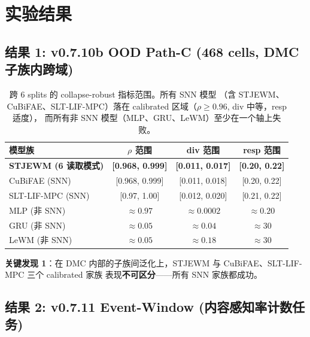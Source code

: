 \documentclass[11pt,a4paper]{article}
\begin{document}
\section{实验结果}

\subsection{结果 1: v0.7.10b OOD Path-C (468 cells, DMC 子族内跨域)}

\begin{table}[ht]
\centering
\small
\begin{tabular}{lccc}
\toprule
模型族 & $\rho$ 范围 & div 范围 & resp 范围 \\
\midrule
\textbf{STJEWM (6 读取模式)} & \textbf{[0.968, 0.999]} & \textbf{[0.011, 0.017]} & \textbf{[0.20, 0.22]} \\
CuBiFAE (SNN) & [0.968, 0.999] & [0.011, 0.018] & [0.20, 0.22] \\
SLT-LIF-MPC (SNN) & [0.97, 1.00] & [0.012, 0.020] & [0.21, 0.22] \\
\midrule
MLP (非 SNN) & $\approx 0.97$ & $\approx 0.0002$ & $\approx 0.20$ \\
GRU (非 SNN) & $\approx 0.05$ & $\approx 0.04$ & $\approx 30$ \\
LeWM (非 SNN) & $\approx 0.05$ & $\approx 0.18$ & $\approx 30$ \\
\bottomrule
\end{tabular}
\caption{跨 6 splits 的 collapse-robust 指标范围。所有 SNN 模型
（含 STJEWM、CuBiFAE、SLT-LIF-MPC）落在 calibrated 区域（$\rho \geq 0.96$, div 中等，resp 适度），
而所有非 SNN 模型（MLP、GRU、LeWM）至少在一个轴上失败。}
\label{tab:oodc}
\end{table}

\textbf{关键发现 1}：在 DMC 内部的子族间泛化上，STJEWM 与 CuBiFAE、SLT-LIF-MPC 三个 calibrated 家族
表现\textbf{不可区分}——所有 SNN 家族都成功。

\subsection{结果 2: v0.7.11 Event-Window (内容感知率计数任务)}
\end{document}
